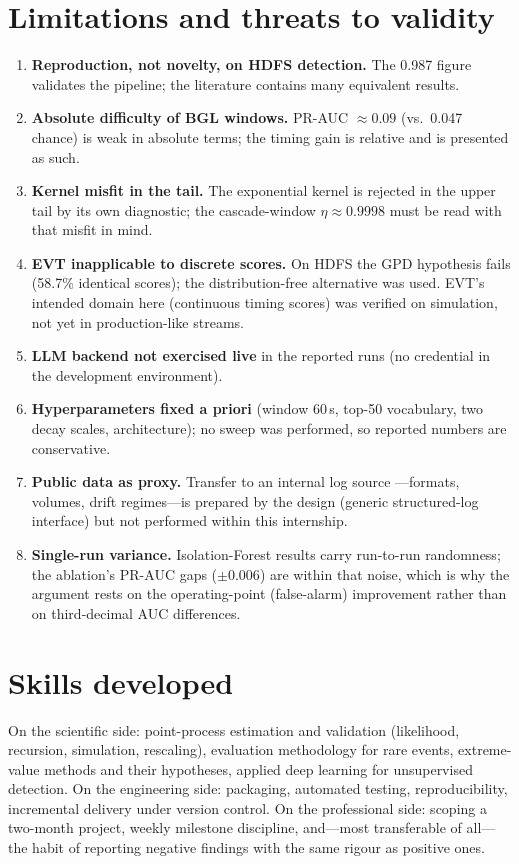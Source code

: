 \documentclass[11pt,a4paper]{report}
\begin{document}
\section{Limitations and threats to validity}
\label{sec:limitations}
\begin{enumerate}[nosep,leftmargin=1.6em]
  \item \textbf{Reproduction, not novelty, on HDFS detection.} The 0.987
  figure validates the pipeline; the literature contains many equivalent
  results.
  \item \textbf{Absolute difficulty of BGL windows.} PR-AUC $\approx0.09$
  (vs.\ 0.047 chance) is weak in absolute terms; the timing gain is
  relative and is presented as such.
  \item \textbf{Kernel misfit in the tail.} The exponential kernel is
  rejected in the upper tail by its own diagnostic; the cascade-window
  $\eta\approx0.9998$ must be read with that misfit in mind.
  \item \textbf{EVT inapplicable to discrete scores.} On HDFS the GPD
  hypothesis fails (58.7\% identical scores); the distribution-free
  alternative was used. EVT's intended domain here (continuous timing
  scores) was verified on simulation, not yet in production-like streams.
  \item \textbf{LLM backend not exercised live} in the reported runs
  (no credential in the development environment).
  \item \textbf{Hyperparameters fixed a priori} (window 60\,s, top-50
  vocabulary, two decay scales, architecture); no sweep was performed, so
  reported numbers are conservative.
  \item \textbf{Public data as proxy.} Transfer to an internal log source
  ---formats, volumes, drift regimes---is prepared by the design (generic
  structured-log interface) but not performed within this internship.
  \item \textbf{Single-run variance.} Isolation-Forest results carry
  run-to-run randomness; the ablation's PR-AUC gaps ($\pm0.006$) are within
  that noise, which is why the argument rests on the operating-point
  (false-alarm) improvement rather than on third-decimal AUC differences.
\end{enumerate}

\section{Skills developed}
On the scientific side: point-process estimation and validation
(likelihood, recursion, simulation, rescaling), evaluation methodology for
rare events, extreme-value methods and their hypotheses, applied deep
learning for unsupervised detection. On the engineering side: packaging,
automated testing, reproducibility, incremental delivery under version
control. On the professional side: scoping a two-month project, weekly
milestone discipline, and---most transferable of all---the habit of
reporting negative findings with the same rigour as positive ones.
\end{document}
